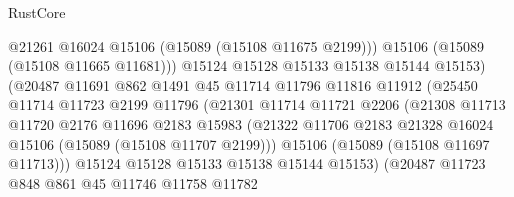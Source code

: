 \begin{lexlean}{RustCore}
\begin{coremodule}
                                    @21261
                                    @16024
                                    @15106
                                    (@15089 (@15108 @11675 @2199)))
                                  @15106
                                  (@15089 (@15108 @11665 @11681)))
                                @15124
                                @15128
                                @15133
                                @15138
                                @15144
                                @15153)
                              (@20487
                                @11691
                                @862
                                @1491
                                @45
                                @11714
                                @11796
                                @11816
                                @11912
                                (@25450
                                  @11714
                                  @11723
                                  @2199
                                  @11796
                                  (@21301
                                    @11714
                                    @11721
                                    @2206
                                    (@21308
                                      @11713
                                      @11720
                                      @2176
                                      @11696
                                      @2183
                                      @15983
                                      (@21322
                                        @11706
                                        @2183
                                        @21328
                                        @16024
                                        @15106
                                        (@15089 (@15108 @11707 @2199)))
                                      @15106
                                      (@15089 (@15108 @11697 @11713)))
                                    @15124
                                    @15128
                                    @15133
                                    @15138
                                    @15144
                                    @15153)
                                  (@20487
                                    @11723
                                    @848
                                    @861
                                    @45
                                    @11746
                                    @11758
                                    @11782

\end{coremodule}
\end{lexlean}
